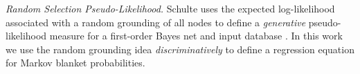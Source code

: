 \documentclass[twoside,leqno,twocolumn]{article}
\begin{document}
{\em Random Selection Pseudo-Likelihood.} Schulte uses the expected log-likelihood associated with a random grounding of all nodes to define a {\em generative} pseudo-likelihood measure for a first-order Bayes net and input database \cite{Schulte2011}. 
In this work we use the random grounding idea {\em discriminatively} to define a regression equation for Markov blanket probabilities.
%
\end{document}
